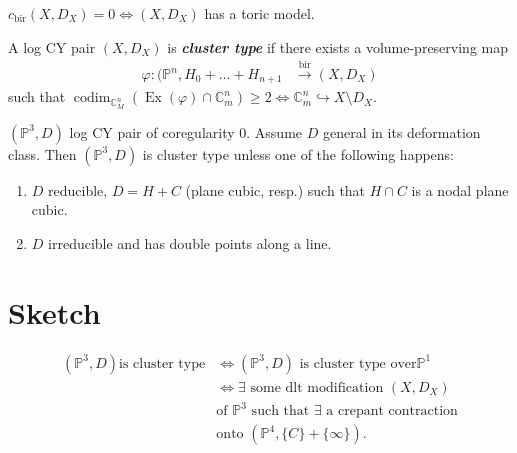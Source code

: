 \begin{thm}\leavevmode
	$c_{\operatorname{bir}}(X,D_X)=0\iff(X,D_X)$ has a toric model.
\end{thm}

\begin{defn}
	A log CY pair $(X,D_X)$ is \textit{\textbf{cluster type}} if there exists a volume-preserving map
	\begin{align*}
		\varphi: (\mathbb{P}^n,H_0+\ldots+H_{n+1} &\overset{\operatorname{bir}}{\longrightarrow}(X,D_X) 
	\end{align*}
such that $\operatorname{codim}_{\mathbb{C}^n_M}(\operatorname{Ex}(\varphi )\cap \mathbb{C}^n_m)\geq 2\iff \mathbb{C}^n_m\hookrightarrow X\setminus D_X$.
	
\end{defn}

\begin{thm}\leavevmode
	$(\mathbb{P}^3,D)$ log CY pair of coregularity 0.  Assume $D$ general in its deformation class. Then $(\mathbb{P}^3,D)$ is cluster type unless one of the following happens:
	\begin{enumerate}[label=(\roman*)]
		\item $D$ reducible, $D=H+C$ (plane cubic, resp.) such that $H\cap C$ is a nodal plane cubic.

		\item $D$ irreducible and has double points along a line.
	\end{enumerate}
\end{thm}

\section{Sketch}

\begin{align*}
	(\mathbb{P}^3,D)\text{is cluster type}  &\iff(\mathbb{P}^3,D) \text{ is cluster type over}\mathbb{P}^1\\
	&\iff\exists \text{ some dlt modification } (X,D_X)\\
	&\text{of $\mathbb{P}^3$ such that $\exists $ a crepant contraction}\\
	&\text{onto $(\mathbb{P}^4,\{C\} +\{\infty\} )$} .
\end{align*}



